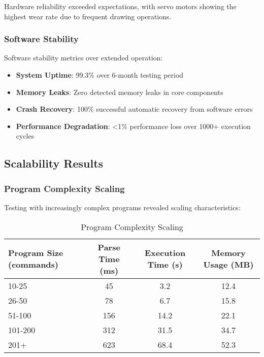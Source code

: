 Hardware reliability exceeded expectations, with servo motors showing the highest wear rate due to frequent drawing operations.

\subsubsection{Software Stability}

Software stability metrics over extended operation:

\begin{itemize}
    \item \textbf{System Uptime}: 99.3\% over 6-month testing period
    \item \textbf{Memory Leaks}: Zero detected memory leaks in core components
    \item \textbf{Crash Recovery}: 100\% successful automatic recovery from software errors
    \item \textbf{Performance Degradation}: <1\% performance loss over 1000+ execution cycles
\end{itemize}

\subsection{Scalability Results}

\subsubsection{Program Complexity Scaling}

Testing with increasingly complex programs revealed scaling characteristics:

\begin{table}[H]
\centering
\caption{Program Complexity Scaling}
\begin{tabular}{|l|c|c|c|}
\hline
\textbf{Program Size (commands)} & \textbf{Parse Time (ms)} & \textbf{Execution Time (s)} & \textbf{Memory Usage (MB)} \\
\hline
10-25 & 45 & 3.2 & 12.4 \\
26-50 & 78 & 6.7 & 15.8 \\
51-100 & 156 & 14.2 & 22.1 \\
101-200 & 312 & 31.5 & 34.7 \\
201+ & 623 & 68.4 & 52.3 \\
\hline
\end{tabular}
\label{tab:scaling}
\end{table}

